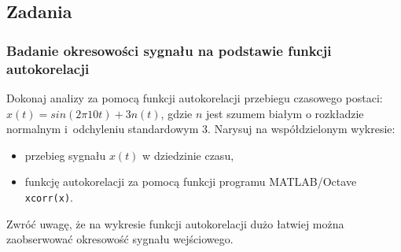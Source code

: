 \subsection{Zadania}

\subsubsection{Badanie okresowości sygnału na podstawie funkcji autokorelacji}
Dokonaj analizy za pomocą funkcji autokorelacji przebiegu czasowego postaci: $x(t) = sin(2\pi10t) + 3n(t)$, gdzie $n$ jest szumem białym o rozkładzie normalnym i~odchyleniu standardowym $3$. Narysuj na współdzielonym wykresie:
\begin{itemize}
	\item przebieg sygnału $x(t)$ w dziedzinie czasu,
	\item funkcję autokorelacji za pomocą funkcji programu MATLAB/Octave \texttt{xcorr(x)}.
\end{itemize}

Zwróć uwagę, że na wykresie funkcji autokorelacji dużo łatwiej można zaobserwować okresowość sygnału wejściowego. 

